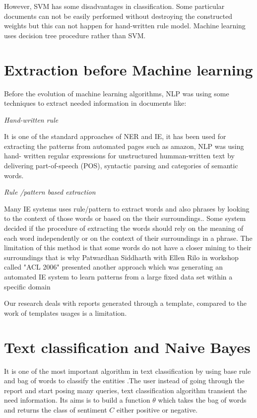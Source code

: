 However, SVM has some disadvantages in classification. Some particular documents can not be  easily performed without destroying the constructed weights  but this can not happen for  hand-written rule model. Machine learning uses decision tree procedure rather than  SVM.

\section{Extraction before Machine learning}
Before the evolution of machine learning algorithms, NLP was using some  techniques to extract needed information in documents like:

\textit{Hand-written rule}

It is one of the standard approaches of NER and IE, it has been used for extracting the patterns from automated pages such as amazon, NLP was using hand- written regular expressions for unstructured humman-written text by delivering  part-of-speech (POS), syntactic parsing and categories of semantic words.

\textit{Rule /pattern based extraction}

Many IE systems uses rule/pattern to extract words and also phrases by looking to the context of those words or based on the their surroundings.\citep{califf2003bottom}. Some system decided if the procedure of extracting the words should rely on the meaning of each word independently or on the context of their surroundings in a phrase.
The limitation of this method is that some words do not have a closer mining to their surroundings that is why Patwardhan Siddharth with  Ellen Rilo  in workshop called "ACL 2006" presented another approach which  was  generating an automated IE system to learn patterns from a large fixed data set  within a specific domain \citep{patwardhan2007effective} 

Our research deals with reports generated through a template, compared to the work of  \citep{patwardhan2007effective} templates usages is a limitation.

\section{Text classification and Naive Bayes}


It is one of the most important algorithm in text classification by using base rule and bag of words to classify the entities \citep{manning2012information}.The user instead of going through the report and start posing many queries, text classification algorithm transient the need information.
Its aims is to build a function $\theta$ which takes the bag of words and returns the class of sentiment $C$ either positive or negative.
 
